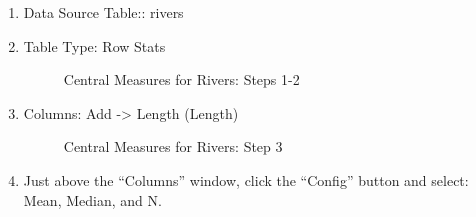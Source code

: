 \begin{enumerate}
  \item Data Source Table:: rivers
  \item Table Type: Row Stats
  
  \begin{figure}[H]
    \begin{center}
      \caption{Central Measures for Rivers: Steps 1-2}
    \end{center}
  \end{figure}
  
  \item Columns: Add -> Length (Length)
  
  \begin{figure}[H]
    \begin{center}
      \caption{Central Measures for Rivers: Step 3}
    \end{center}
  \end{figure}
  
  \item Just above the ``Columns'' window, click the ``Config'' button and select: Mean, Median, and N.
  

\end{enumerate}
